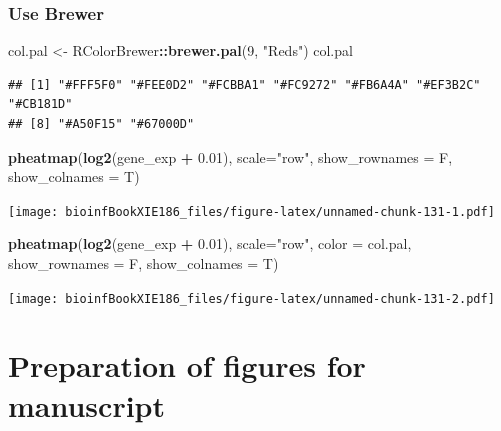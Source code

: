 \documentclass[]{book}
\makeatletter
\newenvironment{Shaded}{\begin{snugshade}}{\end{snugshade}}
\newcommand{\DataTypeTok}[1]{\textcolor[rgb]{0.13,0.29,0.53}{#1}}
\newcommand{\DecValTok}[1]{\textcolor[rgb]{0.00,0.00,0.81}{#1}}
\newcommand{\FloatTok}[1]{\textcolor[rgb]{0.00,0.00,0.81}{#1}}
\newcommand{\KeywordTok}[1]{\textcolor[rgb]{0.13,0.29,0.53}{\textbf{#1}}}
\newcommand{\NormalTok}[1]{#1}
\newcommand{\OperatorTok}[1]{\textcolor[rgb]{0.81,0.36,0.00}{\textbf{#1}}}
\newcommand{\StringTok}[1]{\textcolor[rgb]{0.31,0.60,0.02}{#1}}
\newenvironment{kframe}{%
\medskip{}
\setlength{\fboxsep}{.8em}
 \def\at@end@of@kframe{}%
 \ifinner\ifhmode%
  \def\at@end@of@kframe{\end{minipage}}%
  \begin{minipage}{\columnwidth}%
 \fi\fi%
 \def\FrameCommand##1{\hskip\@totalleftmargin \hskip-\fboxsep
 \colorbox{shadecolor}{##1}\hskip-\fboxsep
     \hskip-\linewidth \hskip-\@totalleftmargin \hskip\columnwidth}%
 \MakeFramed {\advance\hsize-\width
   \@totalleftmargin\z@ \linewidth\hsize
   \@setminipage}}%
 {\par\unskip\endMakeFramed%
 \at@end@of@kframe}
\renewenvironment{Shaded}{\begin{kframe}}{\end{kframe}}
\makeatother
\begin{document}
\hypertarget{use-brewer}{%
\subsection{Use Brewer}\label{use-brewer}}

\begin{Shaded}
\begin{Highlighting}[]
\NormalTok{col.pal <-}\StringTok{ }\NormalTok{RColorBrewer}\OperatorTok{::}\KeywordTok{brewer.pal}\NormalTok{(}\DecValTok{9}\NormalTok{, }\StringTok{"Reds"}\NormalTok{)}
\NormalTok{col.pal }
\end{Highlighting}
\end{Shaded}

\begin{verbatim}
## [1] "#FFF5F0" "#FEE0D2" "#FCBBA1" "#FC9272" "#FB6A4A" "#EF3B2C" "#CB181D"
## [8] "#A50F15" "#67000D"
\end{verbatim}

\begin{Shaded}
\begin{Highlighting}[]
\KeywordTok{pheatmap}\NormalTok{(}\KeywordTok{log2}\NormalTok{(gene_exp }\OperatorTok{+}\StringTok{ }\FloatTok{0.01}\NormalTok{), }\DataTypeTok{scale=}\StringTok{"row"}\NormalTok{,}
         \DataTypeTok{show_rownames =}\NormalTok{ F, }\DataTypeTok{show_colnames =}\NormalTok{ T)}
\end{Highlighting}
\end{Shaded}

\texttt{[image: bioinfBookXIE186\_files/figure-latex/unnamed-chunk-131-1.pdf]}

\begin{Shaded}
\begin{Highlighting}[]
\KeywordTok{pheatmap}\NormalTok{(}\KeywordTok{log2}\NormalTok{(gene_exp }\OperatorTok{+}\StringTok{ }\FloatTok{0.01}\NormalTok{), }\DataTypeTok{scale=}\StringTok{"row"}\NormalTok{, }\DataTypeTok{color =}\NormalTok{ col.pal,}
         \DataTypeTok{show_rownames =}\NormalTok{ F, }\DataTypeTok{show_colnames =}\NormalTok{ T)}
\end{Highlighting}
\end{Shaded}

\texttt{[image: bioinfBookXIE186\_files/figure-latex/unnamed-chunk-131-2.pdf]}

\hypertarget{preparation-of-figures-for-manuscript}{%
\chapter{Preparation of figures for manuscript}\label{preparation-of-figures-for-manuscript}}
\end{document}
